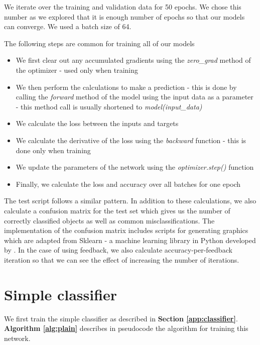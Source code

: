 \documentclass{l4proj}
\begin{document}
We iterate over the training and validation data for 50 epochs. We chose this number as we explored that it is enough number of epochs so that our models can converge. We used a batch size of 64.

The following steps are common for training all of our models
\begin{itemize}
    \item We first clear out any accumulated gradients using the \textit{zero\_grad} method of the optimizer - used only when training
    \item We then perform the calculations to make a prediction - this is done by calling the \textit{forward} method of the model using the input data as a parameter - this method call is usually shortened to \textit{model(input\_data)}
    \item We calculate the loss between the inputs and targets
    \item We calculate the derivative of the loss using the \textit{backward} function - this is done only when training
    \item We update the parameters of the network using the  \textit{optimizer.step()} function
    \item Finally, we calculate the loss and accuracy over all batches for one epoch
\end{itemize}

The test script follows a similar pattern. In addition to these calculations, we also calculate a confusion matrix for the test set which gives us the number of correctly classified objects as well as common misclassifications. The implementation of the confusion matrix includes scripts for generating graphics which are adapted from Sklearn - a machine learning library in Python developed by \cite{scikit-learn}.
In the case of using feedback, we also calculate accuracy-per-feedback iteration so that we can see the effect of increasing the number of iterations.


\section{Simple classifier}
We first train the simple classifier as described in \textbf{Section \ref{app:classifier}}. \textbf{Algorithm \ref{alg:plain}} describes in pseudocode the algorithm for training this network.
\end{document}
